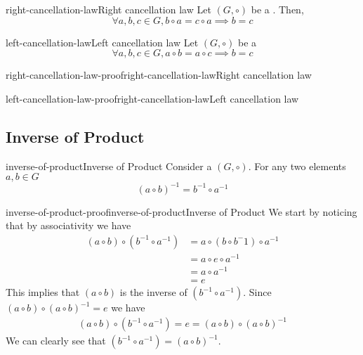 \documentclass[preview]{standalone}
\begin{document}
\begin{snippettheorem}{right-cancellation-law}{Right cancellation law}
    Let \((G, \circ)\) be a \group. Then,
    \[
        \forall a,b,c \in G, b \circ a = c \circ a \implies b = c
    \]
\end{snippettheorem}

\begin{snippettheorem}{left-cancellation-law}{Left cancellation law}
    Let \((G, \circ)\) be a \group
    \[
        \forall a,b,c \in G, a \circ b = a \circ c \implies b = c
    \]
\end{snippettheorem}

\begin{snippetproof}{right-cancellation-law-proof}{right-cancellation-law}{Right cancellation law}
    \todo
\end{snippetproof}

\begin{snippetproof}{left-cancellation-law-proof}{right-cancellation-law}{Left cancellation law}
    \todo
\end{snippetproof}

\subsection{Inverse of Product}

\begin{snippettheorem}{inverse-of-product}{Inverse of Product}
    Consider a \group \((G, \circ)\). For any two elements \(a,b \in G\)
    \[{(a \circ b)}^{-1} = b^{-1} \circ a^{-1}\]
\end{snippettheorem}

\begin{snippetproof}{inverse-of-product-proof}{inverse-of-product}{Inverse of Product}
    We start by noticing that by associativity we have
    \begin{align*}
        (a \circ b) \circ (b^{-1} \circ a^{-1}) &= a \circ (b \circ b^-1) \circ a^{-1} \\
        &= a \circ e \circ a^{-1} \\
        &= a \circ a^{-1} \\
        &= e
    \end{align*}
    This implies that \((a \circ b)\) is the inverse of \((b^{-1} \circ a^{-1})\).
    Since \((a\circ b) \circ {(a \circ b)}^{-1} =e\) we have
    \begin{align*}
        (a \circ b) \circ (b^{-1} \circ a^{-1}) = e = (a\circ b) \circ {(a \circ b)}^{-1}
    \end{align*}
    We can clearly see that \((b^{-1} \circ a^{-1}) = {(a \circ b)}^{-1}\).
\end{snippetproof}
\end{document}
